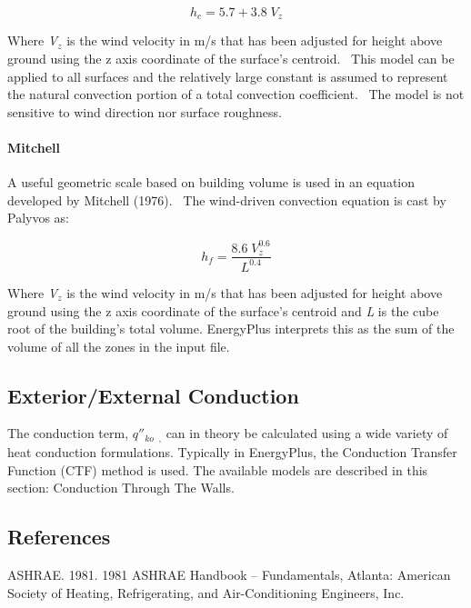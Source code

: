 \begin{equation}
{h_c} = 5.7 + 3.8\;{V_z}
\end{equation}

Where \emph{V\(_{z}\)} is the wind velocity in m/s that has been adjusted for height above ground using the z axis coordinate of the surface's centroid.~ This model can be applied to all surfaces and the relatively large constant is assumed to represent the natural convection portion of a total convection coefficient.~ The model is not sensitive to wind direction nor surface roughness.

\paragraph{Mitchell}\label{mitchell}

A useful geometric scale based on building volume is used in an equation developed by Mitchell (1976).~ The wind-driven convection equation is cast by Palyvos as:

\begin{equation}
{h_f} = \frac{{8.6\;V_z^{0.6}}}{{{L^{0.4}}}}
\end{equation}

Where \emph{V\(_{z}\)} is the wind velocity in m/s that has been adjusted for height above ground using the z axis coordinate of the surface's centroid and \emph{L} is the cube root of the building's total volume. EnergyPlus interprets this as the sum of the volume of all the zones in the input file.

\subsection{Exterior/External Conduction}\label{exteriorexternal-conduction}

The conduction term, \({q''_{ko}}\) \(_{,}\) can in theory be calculated using a wide variety of heat conduction formulations. Typically in EnergyPlus, the Conduction Transfer Function (CTF) method is used. The available models are described in this section: Conduction Through The Walls.

\subsection{References}\label{references-1-013}

ASHRAE. 1981. 1981 ASHRAE Handbook -- Fundamentals, Atlanta: American Society of Heating, Refrigerating, and Air-Conditioning Engineers, Inc.

